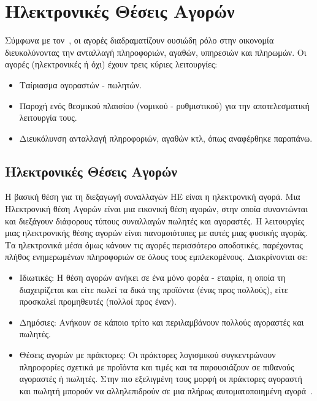 \documentclass[12pt]{report}
\begin{document}
\section{Ηλεκτρονικές Θέσεις Αγορών}
Σύμφωνα με τον~\cite{bakos_1998}, οι αγορές διαδραματίζουν ουσιώδη ρόλο στην οικονομία διευκολύνοντας την ανταλλαγή πληροφοριών, αγαθών, υπηρεσιών και πληρωμών. Οι αγορές (ηλεκτρονικές ή όχι) έχουν τρεις κύριες λειτουργίες:
\begin{itemize}
  \item Ταίριασμα αγοραστών - πωλητών.
  \item Παροχή ενός θεσμικού πλαισίου (νομικού - ρυθμιστικού) για την αποτελεσματική λειτουργία τους.
  \item Διευκόλυνση ανταλλαγή πληροφοριών, αγαθών κτλ, όπως αναφέρθηκε παραπάνω.
\end{itemize}

\subsection{Ηλεκτρονικές Θέσεις Αγορών}
Η βασική θέση για τη διεξαγωγή συναλλαγών ΗΕ είναι η ηλεκτρονική αγορά. Μια Ηλεκτρονική θέση Αγορών είναι μια εικονική θέση αγορών, στην οποία συναντώνται και διεξάγουν διάφορους τύπους συναλλαγών πωλητές και αγοραστές. Η λειτουργίες μιας ηλεκτρονικής θέσης αγορών είναι πανομοιότυπες με αυτές μιας φυσικής αγοράς. Τα ηλεκτρονικά μέσα όμως κάνουν τις αγορές περισσότερο αποδοτικές, παρέχοντας πλήθος ενημερωμένων πληροφοριών σε όλους τους εμπλεκομένους. Διακρίνονται σε:
\begin{itemize}
  \item Ιδιωτικές: Η θέση αγορών ανήκει σε ένα μόνο φορέα - εταιρία, η οποία τη διαχειρίζεται και είτε πωλεί τα δικά της προϊόντα (ένας προς πολλούς), είτε προσκαλεί προμηθευτές (πολλοί προς έναν).
  \item Δημόσιες: Ανήκουν σε κάποιο τρίτο και περιλαμβάνουν πολλούς αγοραστές και πωλητές.
  \item Θέσεις αγορών με πράκτορες: Οι πράκτορες λογισμικού συγκεντρώνουν πληροφορίες σχετικά με προϊόντα και τιμές και τα παρουσιάζουν σε πιθανούς αγοραστές ή πωλητές. Στην πιο εξελιγμένη τους μορφή οι πράκτορες αγοραστή και πωλητή μπορούν να αλληλεπιδρούν σε μια πλήρως αυτοματοποιημένη αγορά~\cite{turban_outland_king_lee_liang_turban_2018}.
\end{itemize}
\end{document}
